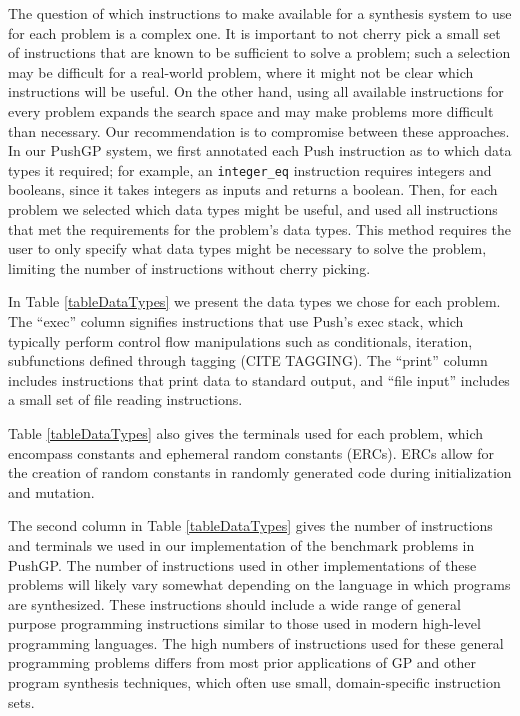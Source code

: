 \documentclass{sig-alternate}
\begin{document}
The question of which instructions to make available for a synthesis system to use for each problem is a complex one. It is important to not cherry pick a small set of instructions that are known to be sufficient to solve a problem; such a selection may be difficult for a real-world problem, where it might not be clear which instructions will be useful. On the other hand, using all available instructions for every problem expands the search space and may make problems more difficult than necessary. Our recommendation is to compromise between these approaches. In our PushGP system, we first annotated each Push instruction as to which data types it required; for example, an \texttt{integer\_eq} instruction requires integers and booleans, since it takes integers as inputs and returns a boolean. Then, for each problem we selected which data types might be useful, and used all instructions that met the requirements for the problem's data types. This method requires the user to only specify what data types might be necessary to solve the problem, limiting the number of instructions without cherry picking.

In Table \ref{tableDataTypes} we present the data types we chose for each problem. The ``exec'' column signifies instructions that use Push's exec stack, which typically perform control flow manipulations such as conditionals, iteration, subfunctions defined through tagging (CITE TAGGING). The ``print'' column includes instructions that print data to standard output, and ``file input'' includes a small set of file reading instructions.

Table \ref{tableDataTypes} also gives the terminals used for each problem, which encompass constants and ephemeral random constants (ERCs). ERCs allow for the creation of random constants in randomly generated code during initialization and mutation. 

The second column in Table \ref{tableDataTypes} gives the number of instructions and terminals we used in our implementation of the benchmark problems in PushGP. The number of instructions used in other implementations of these problems will likely vary somewhat depending on the language in which programs are synthesized. These instructions should include a wide range of general purpose programming instructions similar to those used in modern high-level programming languages. The high numbers of instructions used for these general programming problems differs from most prior applications of GP and other program synthesis techniques, which often use small, domain-specific instruction sets.
\end{document}

